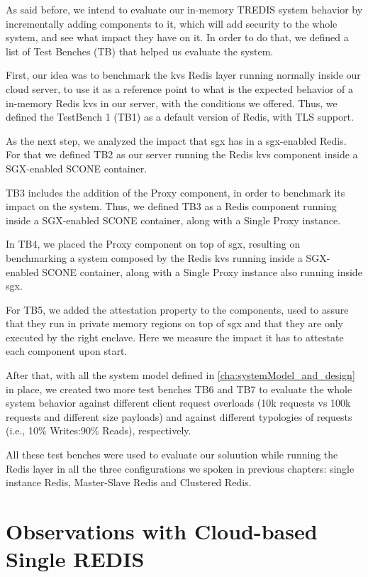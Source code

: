 As said before, we intend to evaluate our in-memory TREDIS system behavior by incrementally adding components to it, which will add security to the whole system, and see what impact they have on it. In order to do that, we defined a list of Test Benches (TB) that helped us evaluate the system.

First, our idea was to benchmark the \gls{kvs} Redis layer running normally inside our cloud server, to use it as a reference point to what is the expected behavior of a in-memory Redis \gls{kvs} in our server, with the conditions we offered. Thus, we defined the TestBench 1 (TB1) as a default version of Redis, with TLS support.

As the next step, we analyzed the impact that \gls{sgx} has in a \gls{sgx}-enabled Redis. For that we defined TB2 as our server running the Redis \gls{kvs} component inside a SGX-enabled SCONE container.

TB3 includes the addition of the Proxy component, in order to benchmark its impact on the system. Thus, we defined TB3 as a Redis component running inside a SGX-enabled SCONE container, along with a Single Proxy instance.

In TB4, we placed the Proxy component on top of \gls{sgx}, resulting on benchmarking a system composed by the Redis \gls{kvs} running inside a SGX-enabled SCONE container, along with a Single Proxy instance also running inside \gls{sgx}.

For TB5, we added the attestation property to the components, used to assure that they run in private memory regions on top of \gls{sgx} and that they are only executed by the right enclave. Here we measure the impact it has to attestate each component upon start.

After that, with all the system model defined in \ref{cha:systemModel_and_design} in place, we created two more test benches TB6 and TB7 to evaluate the whole system behavior against different client request overloads (10k requests vs 100k requests and different size payloads) and against different typologies of requests (i.e., 10\% Writes:90\% Reads), respectively.

All these test benches were used to evaluate our soluution while running the Redis layer in all the three configurations we spoken in previous chapters: single instance Redis, Master-Slave Redis and Clustered Redis.


\section{Observations with Cloud-based Single REDIS}
\label{sec:cloudS_Redis}


